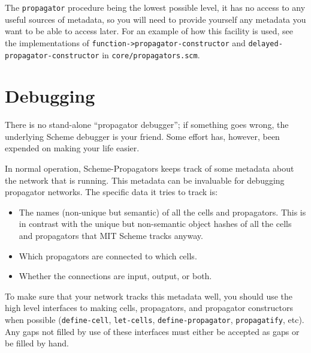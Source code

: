 \documentclass[12pt,letterpaper,english]{article}
\begin{document}
The \texttt{propagator} procedure being the lowest possible level, it has
no access to any useful sources of metadata, so you will need to
provide yourself any metadata you want to be able to access later.
For an example of how this facility is used, see the implementations
of \texttt{function->propagator-constructor} and
\texttt{delayed-propagator-constructor} in \texttt{core/propagators.scm}.



\section{Debugging}
\label{debugging}

There is no stand-alone ``propagator debugger''; if something goes
wrong, the underlying Scheme debugger is your friend.  Some effort
has, however, been expended on making your life easier.

In normal operation, Scheme-Propagators keeps track of some metadata
about the network that is running.  This metadata can be invaluable
for debugging propagator networks.  The specific data it tries to
track is:
\begin{itemize}
\item {} 
The names (non-unique but semantic) of all the cells and
propagators.  This is in contrast with the unique but non-semantic
object hashes of all the cells and propagators that MIT Scheme
tracks anyway.

\item {} 
Which propagators are connected to which cells.

\item {} 
Whether the connections are input, output, or both.

\end{itemize}

To make sure that your network tracks this metadata well, you should
use the high level interfaces to making cells, propagators, and
propagator constructors when possible (\texttt{define-cell}, \texttt{let-cells},
\texttt{define-propagator}, \texttt{propagatify}, etc).  Any gaps not
filled by use of these interfaces must either be accepted as gaps or
be filled by hand.
\end{document}
